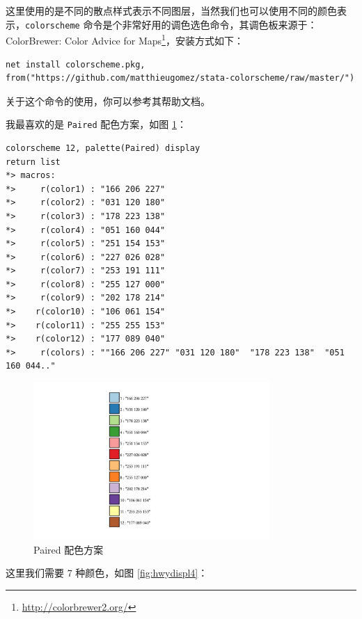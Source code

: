 \documentclass[]{ctexbook}
\renewcommand{\href}[2]{#2\footnote{\url{#1}}}
\begin{document}
这里使用的是不同的散点样式表示不同图层，当然我们也可以使用不同的颜色表示，\texttt{colorscheme} 命令是个非常好用的调色选色命令，其调色板来源于： \href{http://colorbrewer2.org/}{ColorBrewer: Color Advice for Maps}，安装方式如下：

\begin{lstlisting}
net install colorscheme.pkg, from("https://github.com/matthieugomez/stata-colorscheme/raw/master/")
\end{lstlisting}

关于这个命令的使用，你可以参考其帮助文档。

我最喜欢的是 \texttt{Paired} 配色方案，如图 \ref{fig:Paired}：

\begin{lstlisting}
colorscheme 12, palette(Paired) display
return list
*> macros:
*>     r(color1) : "166 206 227"
*>     r(color2) : "031 120 180"
*>     r(color3) : "178 223 138"
*>     r(color4) : "051 160 044"
*>     r(color5) : "251 154 153"
*>     r(color6) : "227 026 028"
*>     r(color7) : "253 191 111"
*>     r(color8) : "255 127 000"
*>     r(color9) : "202 178 214"
*>    r(color10) : "106 061 154"
*>    r(color11) : "255 255 153"
*>    r(color12) : "177 089 040"
*>     r(colors) : ""166 206 227" "031 120 180"  "178 223 138"  "051 160 044.."
\end{lstlisting}

\begin{figure}

{\centering \includegraphics[width=0.8\textwidth]{assets/Paired} 

}

\caption{Paired 配色方案}\label{fig:Paired}
\end{figure}

这里我们需要 7 种颜色，如图 \ref{fig:hwydispl4}：
\end{document}
